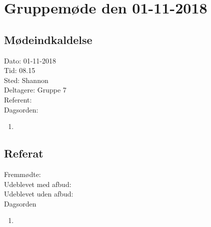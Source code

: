 \section{Gruppemøde den 01-11-2018}
\subsection{Mødeindkaldelse}
Dato: 01-11-2018
\\Tid: 08.15
\\Sted: Shannon
\\Deltagere: Gruppe 7
\\Referent: 
\\Dagsorden:
\begin{enumerate}
    \item 
\end{enumerate}

\subsection{Referat}
 Fremmødte: 
 \\Udeblevet med afbud:
 \\Udeblevet uden afbud: 
 \\Dagsorden 
 
 \begin{enumerate}
    \item 
\end{enumerate}

